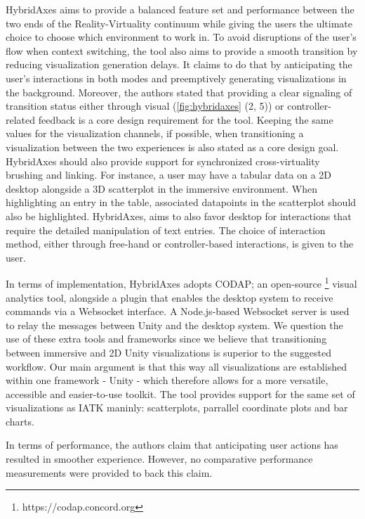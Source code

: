 \documentclass{vgtc}                          %
\begin{document}
\noindent HybridAxes aims to provide a balanced feature set and performance
between the two ends of the Reality-Virtuality continuum while giving the users the ultimate choice to choose
which environment to work in. To avoid disruptions of the user's
flow when context switching, the tool also aims to provide a smooth transition
by reducing visualization generation delays. It claims to do that by
anticipating the user's interactions in both modes and preemptively generating
visualizations in the background. Moreover, the authors stated that providing
a clear signaling of transition status either through visual (\cref{fig:hybridaxes} (2, 5)) or
controller-related feedback is a core design requirement for the tool.
Keeping the same values for the visualization channels, if possible, when
transitioning a visualization between the two experiences is also stated as
a core design goal. HybridAxes should also provide support for synchronized
cross-virtuality brushing and linking. For instance, a user may have a tabular
data on a 2D desktop alongside a 3D scatterplot in the immersive environment.
When highlighting an entry in the table, associated datapoints in the
scatterplot should also be highlighted. HybridAxes, aims to also favor desktop
for interactions that require the detailed manipulation of text entries. The
choice of interaction method, either through free-hand or
controller-based interactions, is given to the user.

\medskip

\noindent In terms of implementation, HybridAxes adopts CODAP; an open-source
\footnote{https://codap.concord.org} visual analytics tool, alongside a plugin
that enables the desktop system to receive commands via a Websocket interface.
A Node.js-based Websocket server is used to relay the messages between Unity
and the desktop system. We question the use of these extra tools and frameworks
since we believe that transitioning between immersive and 2D Unity
visualizations is superior to the suggested workflow. Our main argument is
that this way all visualizations are established within one framework - Unity -
which therefore allows for a more versatile, accessible and easier-to-use
toolkit. The tool provides support for the same set of visualizations as IATK
maninly: scatterplots, parrallel coordinate plots and bar charts.

\medskip

\noindent In terms of performance, the authors claim that anticipating user
actions has resulted in smoother experience. However, no comparative
performance measurements were provided to back this claim.
\end{document}

